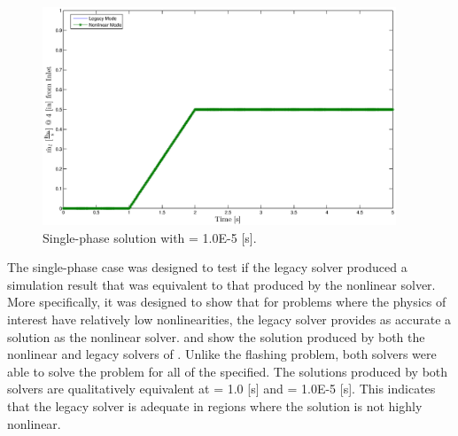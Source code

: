 \begin{figure}[h!t]
\centering
\includegraphics[width=0.94\textwidth]{images/single_1em5.eps}
\caption{Single-phase solution with \dtmax{} = 1.0E-5 {[s]}.}
\label{fig:single_1em5}
\end{figure}

The single-phase case was designed to test if the legacy solver produced a simulation result that was equivalent to that produced by the nonlinear solver.
More specifically, it was designed to show that for problems where the physics of interest have relatively low nonlinearities, the legacy solver provides as accurate a solution as the nonlinear solver.
 and  show the solution produced by both the nonlinear and legacy solvers of \cobra{}.
Unlike the flashing problem, both solvers were able to solve the problem for all of the \dtmax{} specified.
The solutions produced by both solvers are qualitatively equivalent at \dtmax{} = 1.0 [s] and \dtmax{} = 1.0E-5 [s].
This indicates that the legacy solver is adequate in regions where the solution is not highly nonlinear.


